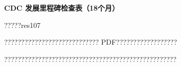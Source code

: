 \documentclass[11pt]{article}
\begin{document}
{\color[HTML]{0A84FF}\LARGE\bfseries CDC 发展里程碑检查表（18个月）\par}
{\color[HTML]{667085}\small ?????res107\par}
\vspace{1em}
???????????????????????????? PDF??????????????????

???????????????????????????????????????????????????
\end{document}

